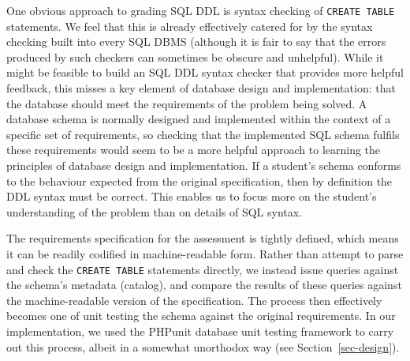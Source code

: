 \documentclass[sigconf, authordraft]{acmart}
\begin{document}
One obvious approach to grading SQL DDL is syntax checking of \texttt{CREATE TABLE} statements. We feel that this is already effectively catered for by the syntax checking built into every SQL DBMS (although it is fair to say that the errors produced by such checkers can sometimes be obscure and unhelpful). While it might be feasible to build an SQL DDL syntax checker that provides more helpful feedback, this misses a key element of database design and implementation: that the database should meet the requirements of the problem being solved. A database schema is normally designed and implemented within the context of a specific set of requirements, so checking that the implemented SQL schema fulfils these requirements would seem to be a more helpful approach to learning the principles of database design and implementation. If a student's schema conforms to the behaviour expected from the original specification, then by definition the DDL syntax must be correct. This enables us to focus more on the student's understanding of the problem than on details of SQL syntax.


The requirements specification for the assessment is tightly defined, which means it can be readily codified in machine-readable form. Rather than attempt to parse and check the \texttt{CREATE TABLE} statements directly, we instead issue queries against the schema's metadata (catalog), and compare the results of these queries against the machine-readable version of the specification. The process then effectively becomes one of unit testing the schema against the original requirements. In our implementation, we used the PHPunit database unit testing framework to carry out this process, albeit in a somewhat unorthodox way (see Section~\ref{sec-design}).

\end{document}
